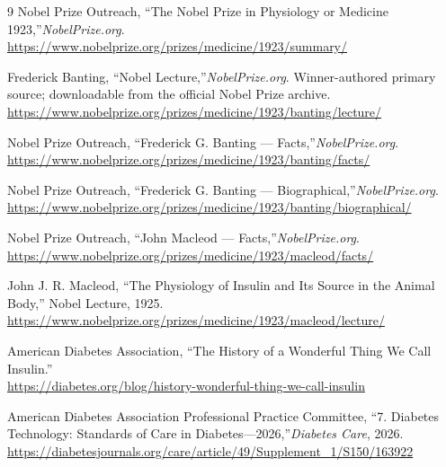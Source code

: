 \begin{thebibliography}{9}
Nobel Prize Outreach, ``The Nobel Prize in Physiology or Medicine 1923,''\emph{NobelPrize.org}.\\
\url{https://www.nobelprize.org/prizes/medicine/1923/summary/}

Frederick Banting, ``Nobel Lecture,''\emph{NobelPrize.org}. Winner-authored primary source; downloadable from the official Nobel Prize archive.\\
\url{https://www.nobelprize.org/prizes/medicine/1923/banting/lecture/}

Nobel Prize Outreach, ``Frederick G. Banting --- Facts,''\emph{NobelPrize.org}.\\
\url{https://www.nobelprize.org/prizes/medicine/1923/banting/facts/}

Nobel Prize Outreach, ``Frederick G. Banting --- Biographical,''\emph{NobelPrize.org}.\\
\url{https://www.nobelprize.org/prizes/medicine/1923/banting/biographical/}

Nobel Prize Outreach, ``John Macleod --- Facts,''\emph{NobelPrize.org}.\\
\url{https://www.nobelprize.org/prizes/medicine/1923/macleod/facts/}

John J. R. Macleod, ``The Physiology of Insulin and Its Source in the Animal Body,'' Nobel Lecture, 1925.\\
\url{https://www.nobelprize.org/prizes/medicine/1923/macleod/lecture/}

American Diabetes Association, ``The History of a Wonderful Thing We Call Insulin.''\\
\url{https://diabetes.org/blog/history-wonderful-thing-we-call-insulin}

American Diabetes Association Professional Practice Committee, ``7. Diabetes Technology: Standards of Care in Diabetes---2026,''\emph{Diabetes Care}, 2026.\\
\url{https://diabetesjournals.org/care/article/49/Supplement_1/S150/163922}
\end{thebibliography}
